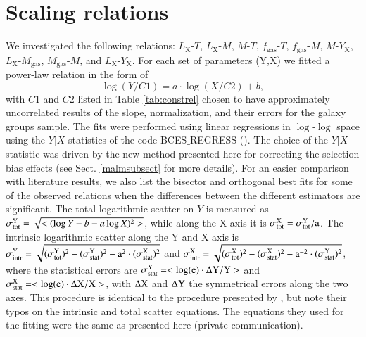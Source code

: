 \documentclass{aa} %
\begin{document}
\section{Scaling relations} \label{scallaw}
We investigated the following relations: $L_\text{X}$-$T$,  $L_\text{X}$-$M$, $M$-$T$, $f_{\text{gas}}$-$T$, $f_{\text{gas}}$-$M$, $M$-$Y_{\text{X}}$, $L_\text{X}$-$M_{\text{gas}}$, $M_{\text{gas}}$-$M$, and
$L_\text{X}$-$Y_\text{X}$. For each set of parameters (Y,X) we fitted a power-law
relation in the form of
\begin{equation}
\log(Y/C1)=a\cdot\log(X/C2)+b,
\end{equation} 
with $C1$ and $C2$ listed in Table \ref{tab:constrel} chosen to have
approximately uncorrelated results of the slope, normalization, and
their errors for the galaxy groups sample. The fits were performed
using linear regressions in $\log$-$\log$ space using the $Y|X$
statistics of the code BCES$\_$REGRESS 
(\citealt{1996ApJ...470..706A}). The choice of the $Y|X$ statistic was driven by the new method presented here for correcting the selection bias effects (see Sect. \ref{malmsubsect} for more details). For an easier comparison with  literature
results, we also list the bisector and
orthogonal best fits for some of the observed relations when the differences between the different estimators
are significant. The total logarithmic scatter on $Y$ is measured as
${\rm \sigma_{tot}^Y=\sqrt{<(\log Y - b - a\log X)^2>} }$, while along
the X-axis it is ${\rm \sigma_{tot}^X=\sigma_{tot}^Y/a }$. The intrinsic
logarithmic scatter along the Y and X axis is ${\rm
  \sigma_{intr}^Y=\sqrt{\rm (\sigma_{tot}^Y)^2 - (\sigma_{stat}^Y)^2 -
    a^2\cdot (\sigma_{stat}^X)^2} }$ and ${\rm
  \sigma_{intr}^X=\sqrt{\rm (\sigma_{tot}^X)^2 - (\sigma_{stat}^X)^2 -
    a^{-2}\cdot (\sigma_{stat}^Y)^2} }$, where the statistical errors
are ${\rm \sigma_{stat}^Y=<\log(e) \cdot \Delta Y/Y> }$ and ${\rm
  \sigma_{stat}^X=<\log(e) \cdot \Delta X/X> }$, with ${\rm \Delta X}$ and ${\rm \Delta Y}$ the symmetrical errors along the two axes. This procedure is identical to the procedure presented by \citet{2011A&A...535A.105E}, but note their typos on the intrinsic and total scatter equations. The equations they used for the fitting were the same as presented here (private communication).
   
\end{document}
